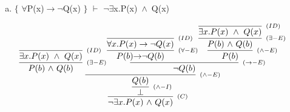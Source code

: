 \documentclass[aspectratio=43]{beamer}
\newcommand{\ria}{$\rightarrow$}
\newcommand{\fall}{$\forall$}
\newcommand{\ex}{$\exists$}
\newcommand{\nao}{$\neg$}
\newcommand{\nex}{\nao\ex}
\newcommand{\andd}{$\wedge$}
\begin{document}
	\begin{frame}[fragile]
    
    	\begin{enumerate}[b)]
			
			\item $\{$ \fall P(x)\ria \nao Q(x) $\}$ $\vdash$ \nex  x.P(x)\ \andd\ Q(x) \\ 
			
		\end{enumerate}
        \vspace{50pt}
		\[
        \begin{array}{c}
		\infer[_{(C)}]
			{$\nex$ x.P(x)\ $\andd$\ Q(x)}
			{\infer[_{(\land-I)}] 
            	{\bot}
                {\infer[_{(\land-E)}] 
                	{Q(b)}
                    {\infer[_{(\exists-E)}]
                    	{P(b)\ $\andd$\ Q(b)}
                        {\infer[_{(ID)}] 
                			{\exists x.P(x)\ \wedge\ Q(x)}
                    		{}
                    	}
                	\infer[_{(\to-E)}] 
                		{$\nao$ Q(b)}
                		{\infer[_{(\forall-E)}] 
                    		{P(b) $\ria$ $\nao$ Q(b)}
                    		{\infer[_{(ID)}]
                				{\forall x.P(x)\to \neg Q(x)}
                    			{}
                			}
                    	\infer[_{(\land-E)}] 
                    		{P(b)}
                        	{\infer[_{(\exists-E)}] 
                        		{P(b)\ $\andd$\ Q(b)}
                        		{\infer[_{(ID)}]
                            		{\exists x.P(x)\ \wedge\ Q(x)}
                            		{}
                            	}
                        	}
                    	}
                	}
            	}
            }
		\end{array}
        \]
		
	\end{frame}
	
\end{document}
